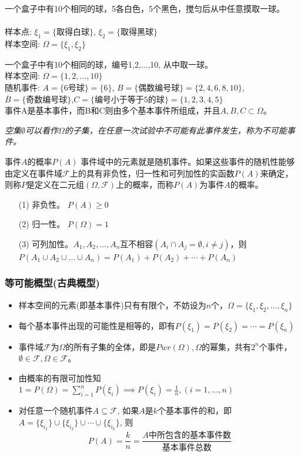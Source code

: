 \begin{frame}
\begin{example}
	一个盒子中有10个相同的球，5各白色，5个黑色，搅匀后从中任意摸取一球。\\
	~\\
	样本点: $\xi_1=\{\text{取得白球} \}$, $\xi_2=\{\text{取得黑球} \}$\\
	样本空间: $\Omega=\{\xi_1,\xi_2\}$
\end{example}
\begin{example}
	一个盒子中有10个相同的球，编号1,2,...,10, 从中取一球。\\
	样本空间: $\Omega=\{1,2,\dots,10\}$\\
	随机事件: $A=\{\text{6号球} \}=\{6\}$, $B=\{\text{偶数编号球} \}=\{2,4,6,8,10\}$, $\overline{B}=\{\text{奇数编号球}\}$,$C=\{\text{编号小于等于5的球} \}=\{1,2,3,4,5\}$\\
	事件A是基本事件，而B和C则由多个基本事件所组成，并且$A,B,C\subset\Omega$。
\end{example}
\textit{空集$\emptyset$可以看作$\Omega$的子集，在任意一次试验中不可能有此事件发生，称为不可能事件。}
\end{frame}

\begin{frame}{事件$A$的概率$P(A)$}
  事件域中的元素就是随机事件。如果这些事件的随机性能够由定义在事件域$\mathcal{F}$上的具有非负性，归一性和可列加性的实函数$P(A)$来确定，则称$P$是定义在二元组$(\Omega,\mathcal{F})$上的概率，而称$P(A)$为事件$A$的概率。
  \begin{enumerate}
  	\item[(1)] 非负性。 $P(A)\ge 0$
  	\item[(2)] 归一性。 $P(\Omega)=1$
    \item[(3)] 可列加性。$A_1,A_2,...,A_n$互不相容$(A_i\cap A_j=\emptyset,i\ne j)$，则$P(A_1\cup A_2\cup\dots\cup A_n) = P(A_1)+P(A_2)+\cdots+P(A_n)$
  \end{enumerate}
\end{frame}

\begin{frame}
\frametitle{等可能概型(古典概型)}
\begin{itemize}
	\item 样本空间的元素(即基本事件)只有有限个，不妨设为$n$个，$\Omega=\{\xi_1,\xi_2,\dots,\xi_n\}$
	\item 每个基本事件出现的可能性是相等的，即有$P(\xi_1)=P(\xi_2)=\cdots=P(\xi_n)$
	\item 事件域$\mathcal{F}$为$\Omega$的所有子集的全体，即是$Pwr(\Omega),\Omega$的幂集，共有$2^n$个事件，$\emptyset\in\mathcal{F},\Omega\in\mathcal{F}$。
	\item 由概率的有限可加性知\\
	$1=P(\Omega)=\sum\limits_{i=1}^{n}P(\xi_i)\implies P(\xi_i)=\frac{1}{n},(i=1,\dots,n)$
	\item 对任意一个随机事件$A\subseteq\mathcal{F}$, 如果$A$是$k$个基本事件的和，即$A=\{\xi_{i_1}\}\cup \{\xi_{i_2}\}\cup\cdots\cup\{\xi_{i_k}\}$, 则
	$$P(A)=\frac{k}{n}=\frac{\text{$A$中所包含的基本事件数}}{\text{基本事件总数}}$$
\end{itemize}
\end{frame}

